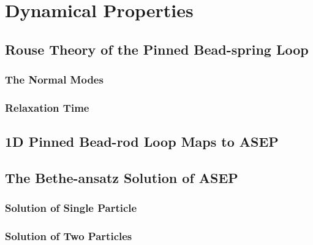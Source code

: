 \chapter{Dynamical Properties}

\ifpdf
    \graphicspath{{Chapter5/Figs/Raster/}{Chapter5/Figs/PDF/}{Chapter5/Figs/}}
\else
    \graphicspath{{Chapter5/Figs/Vector/}{Chapter5/Figs/}}
\fi

\section{Rouse Theory of the Pinned Bead-spring Loop}
\label{sec:rouse_theory_of_the_pinned_bead_spring_loop}

\subsection{The Normal Modes}
\label{sub:the_normal_modes}

\subsection{Relaxation Time}
\label{sub:relaxation_time}




\section{1D Pinned Bead-rod Loop Maps to ASEP}
\label{sec:1d_pinned_bead_rod_loop_maps_to_asep}


\section{The Bethe-ansatz Solution of ASEP}
\label{sec:the_bethe_ansatz_solution_of_asep}

\subsection{Solution of Single Particle}
\label{sub:solution_of_single_particle}

\subsection{Solution of Two Particles}
\label{sub:solution_of_two_particles}

